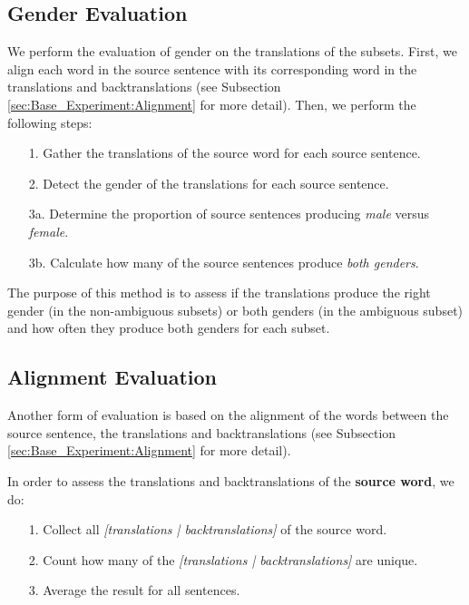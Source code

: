 \subsection{Gender Evaluation}
\label{sec:Base_Experiment:Statistics:Gender}
We perform the evaluation of gender on the translations of the subsets.  First, we align each word in the source sentence with its corresponding word in the translations and backtranslations (see Subsection \ref{sec:Base_Experiment:Alignment} for more detail). Then, we perform the following steps:

\begin{enumerate}
    \item[1. ] Gather the translations of the source word for each source sentence.
    \item[2. ] Detect the gender of the translations for each source sentence.
    \item[3a. ] Determine the proportion of source sentences producing \textit{male} versus \textit{female}.
    \item[3b. ] Calculate how many of the source sentences produce \textit{both genders}. 
\end{enumerate}

The purpose of this method is to assess if the translations produce the right gender (in the non-ambiguous subsets) or both genders (in the ambiguous subset) and how often they produce both genders for each subset.

\subsection{Alignment Evaluation}
\label{sec:Base_Experiment:Statistics:Alignment}
Another form of evaluation is based on the alignment of the words between the source sentence, the translations and backtranslations (see Subsection \ref{sec:Base_Experiment:Alignment} for more detail).

In order to assess the translations and backtranslations of the \textbf{source word}, we do:
\begin{enumerate}
    \item[1. ] Collect all \textit{[translations | backtranslations]} of the source word.
    \item[2. ] Count how many of the \textit{[translations | backtranslations]} are unique.
    \item[3. ] Average the result for all sentences.
\end{enumerate}

